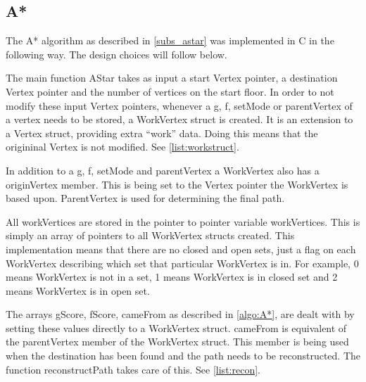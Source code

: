 \subsection{A*}



The A* algorithm as described in \cref{subs_astar} was implemented in C in the following way. The design choices will follow below.



The main function AStar takes as input a start Vertex pointer, a destination Vertex pointer and the number of vertices on the start floor. In order to not modify these input Vertex pointers, whenever a g, f, setMode or parentVertex of a vertex needs to be stored, a WorkVertex struct is created. It is an extension to a Vertex struct, providing extra \enquote{work} data. Doing this means that the origininal Vertex is not modified. See \cref{list:workstruct}.



In addition to a g, f, setMode and parentVertex a WorkVertex also has a originVertex member. This is being set to the Vertex pointer the WorkVertex is based upon. ParentVertex is used for determining the final path.

All workVertices are stored in the pointer to pointer variable workVertices. This is simply an array of pointers to all WorkVertex structs created. This implementation means that there are no closed and open sets, just a flag on each WorkVertex describing which set that particular WorkVertex is in. For example, 0 means WorkVertex is not in a set, 1 means WorkVertex is in closed set and 2 means WorkVertex is in open set.

The arrays gScore, fScore, cameFrom as described in \cref{algo:A*}, are dealt with by setting these values directly to a WorkVertex struct. cameFrom is equivalent of the parentVertex member of the WorkVertex struct. This member is being used when the destination has been found and the path needs to be reconstructed. The function reconstructPath takes care of this. See \cref{list:recon}.



